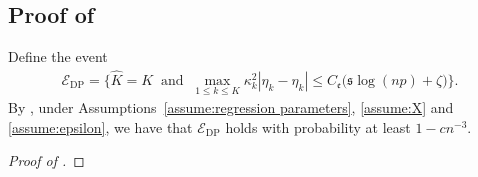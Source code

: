 \documentclass[11pt]{article}
\newcommand{\s}{ { \mathfrak{s}  } }
\theoremstyle{plain}
\theoremstyle{definition}
\begin{document}
\subsection[]{Proof of }
Define the event
\begin{align}\label{eq:event_DP}
    \mathcal{E}_{\mathrm{DP}} = \Big\{ \widehat K = K \;\; \text{and} \;\; \max_{ 1\le k \le K } \kappa_k^2|\eta_k-\widehat \eta_k|  \le  C_{\mathfrak e}   \big(\s \log(np) + \zeta      \big) \Big\}.
\end{align}
By , under Assumptions~\ref{assume:regression parameters}, \ref{assume:X} and \ref{assume:epsilon}, we have that $\mathcal{E}_{\mathrm{DP}}$ holds with probability at least $1 - cn^{-3}$. 


\begin{proof}[Proof of ]


\end{proof}
\end{document}
